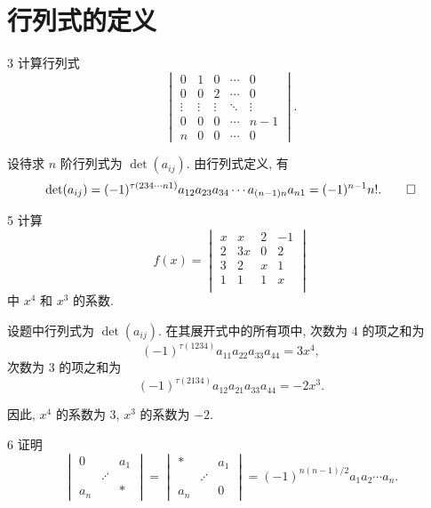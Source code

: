 
\renewcommand{\thesection}{2.1}

\section{行列式的定义}\label{sec:2.1}

\begin{ex}{3}\label{ex:2.1.3}
    计算行列式
    \[
    \begin{vmatrix}
        0 & 1 & 0 & \cdots & 0\\
        0 & 0 & 2 & \cdots & 0\\
        \vdots & \vdots & \vdots & \ddots & \vdots\\
        0 & 0 & 0 & \cdots & n-1\\
        n & 0 & 0 & \cdots & 0
    \end{vmatrix}.
    \]
\end{ex}

\begin{solution}
    设待求 \(n\) 阶行列式为 \(\det(a_{ij})\). 由行列式定义, 有
    \[
    \det(a_{ij})=(-1)^{\tau(234\cdots n1)}a_{12}a_{23}a_{34}\cdots a_{(n-1)n}a_{n1}
    =(-1)^{n-1}n!.\qedhere
    \]
\end{solution}

\begin{ex}{5}\label{ex:2.1.5}
    计算
    \[
    f(x)=
    \begin{vmatrix}
        x & x & 2 & -1\\
        2 & 3x & 0 & 2\\
        3 & 2 & x & 1\\
        1 & 1 & 1 & x\\
    \end{vmatrix}
    \]
    中 \(x^4\) 和 \(x^3\) 的系数.
\end{ex}

\begin{solution}
    设题中行列式为 \(\det(a_{ij})\). 在其展开式中的所有项中, 次数为 \(4\) 的项之和为
    \[
    (-1)^{\tau(1234)}a_{11}a_{22}a_{33}a_{44}=3x^4,
    \]
    次数为 \(3\) 的项之和为
    \[
    (-1)^{\tau(2134)}a_{12}a_{21}a_{33}a_{44}=-2x^3.
    \]
    
    因此, \(x^4\) 的系数为 \(3\), \(x^3\) 的系数为 \(-2\).
\end{solution}

\begin{ex}{6}\label{ex:2.1.6}
    证明
    \[
    \begin{vmatrix}
        0 & & a_1\\
        & \iddots &\\
        a_n & & *
    \end{vmatrix}
    =
    \begin{vmatrix}
        * & & a_1\\
        & \iddots &\\
        a_n & & 0
    \end{vmatrix}
    =(-1)^{n(n-1)/2}a_1a_2\cdots a_n.
    \]
\end{ex}

